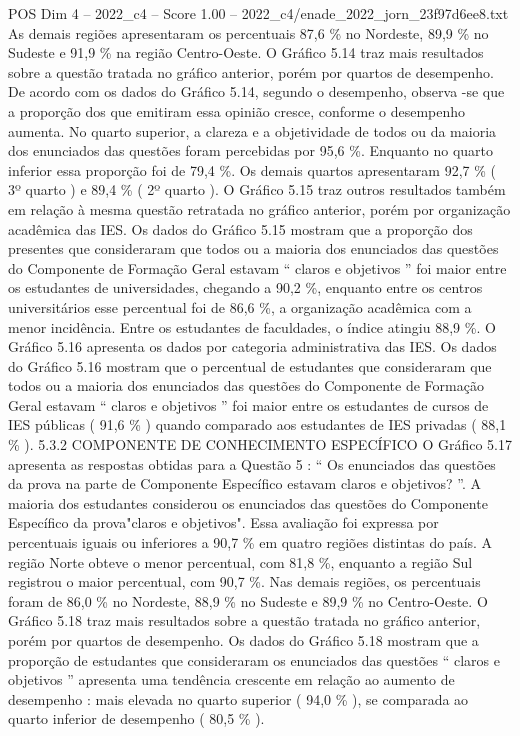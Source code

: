 \begin{textsample}{POS Dim 4 – 2022\_c4 – Score 1.00 – 2022\_c4/enade\_2022\_jorn\_23f97d6ee8.txt}
As demais regiões apresentaram os percentuais 87,6 \% no Nordeste, 89,9 \% no Sudeste e 91,9 \% na região Centro-Oeste.
O Gráfico 5.14 traz mais resultados sobre a questão tratada no gráfico anterior, porém por quartos de desempenho.
De acordo com os dados do Gráfico 5.14, segundo o desempenho, observa -se que a proporção dos que emitiram essa opinião cresce, conforme o desempenho aumenta.
No quarto superior, a clareza e a objetividade de todos ou da maioria dos enunciados das questões foram percebidas por 95,6 \%.
Enquanto no quarto inferior essa proporção foi de 79,4 \%.
Os demais quartos apresentaram 92,7 \% ( 3º quarto ) e 89,4 \% ( 2º quarto ).
O Gráfico 5.15 traz outros resultados também em relação à mesma questão retratada no gráfico anterior, porém por organização acadêmica das IES.
Os dados do Gráfico 5.15 mostram que a proporção dos presentes que consideraram que todos ou a maioria dos enunciados das questões do Componente de Formação Geral estavam “ claros e objetivos ” foi maior entre os estudantes de universidades, chegando a 90,2 \%, enquanto entre os centros universitários esse percentual foi de 86,6 \%, a organização acadêmica com a menor incidência.
Entre os estudantes de faculdades, o índice atingiu 88,9 \%.
O Gráfico 5.16 apresenta os dados por categoria administrativa das IES.
Os dados do Gráfico 5.16 mostram que o percentual de estudantes que consideraram que todos ou a maioria dos enunciados das questões do Componente de Formação Geral estavam “ claros e objetivos ” foi maior entre os estudantes de cursos de IES públicas ( 91,6 \% ) quando comparado aos estudantes de IES privadas ( 88,1 \% ). 5.3.2 COMPONENTE DE CONHECIMENTO ESPECÍFICO O Gráfico 5.17 apresenta as respostas obtidas para a Questão 5 : “ Os enunciados das questões da prova na parte de Componente Específico estavam claros e objetivos? ”.
A maioria dos estudantes considerou os enunciados das questões do Componente Específico da prova"claros e objetivos".
Essa avaliação foi expressa por percentuais iguais ou inferiores a 90,7 \% em quatro regiões distintas do país.
A região Norte obteve o menor percentual, com 81,8 \%, enquanto a região Sul registrou o maior percentual, com 90,7 \%.
Nas demais regiões, os percentuais foram de 86,0 \% no Nordeste, 88,9 \% no Sudeste e 89,9 \% no Centro-Oeste.
O Gráfico 5.18 traz mais resultados sobre a questão tratada no gráfico anterior, porém por quartos de desempenho.
Os dados do Gráfico 5.18 mostram que a proporção de estudantes que consideraram os enunciados das questões “ claros e objetivos ” apresenta uma tendência crescente em relação ao aumento de desempenho : mais elevada no quarto superior ( 94,0 \% ), se comparada ao quarto inferior de desempenho ( 80,5 \% ).

\end{textsample}
